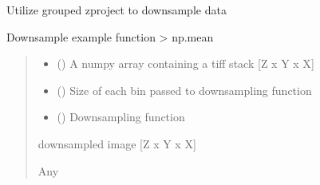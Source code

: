 \documentclass[letterpaper,10pt,english]{sphinxmanual}
\begin{document}
\begin{fulllineitems}
\label{\detokenize{ImageProcessing:ImageProcessing.grouped_z_project}}
\pysigstartsignatures
{}
\pysigstopsignatures
\sphinxAtStartPar
Utilize grouped z\sphinxhyphen{}project to downsample data

\sphinxAtStartPar
Downsample example function \sphinxhyphen{}\textgreater{} np.mean
\begin{quote}\begin{description}
\begin{itemize}
\item {} 
\sphinxAtStartPar
{} () \textendash{} A numpy array containing a tiff stack {[}Z x Y x X{]}

\item {} 
\sphinxAtStartPar
{} (\sphinxstyleliteralemphasis{\sphinxupquote{{[}}}\sphinxstyleliteralemphasis{\sphinxupquote{, }}\sphinxstyleliteralemphasis{\sphinxupquote{{]}}}) \textendash{} Size of each bin passed to downsampling function

\item {} 
\sphinxAtStartPar
{} () \textendash{} Downsampling function

\end{itemize}

\sphinxAtStartPar
downsampled image {[}Z x Y x X{]}

\sphinxAtStartPar
Any

\end{description}\end{quote}

\end{fulllineitems}
\end{document}
